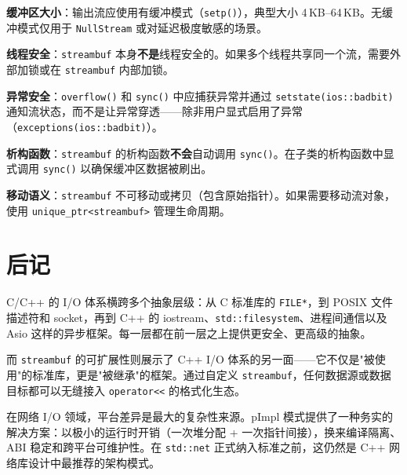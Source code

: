 \documentclass[12pt,a4paper,fontset=fandol]{ctexbook}
\newcommand{\Fn}[1]{\texttt{#1()}}
\newcommand{\Tp}[1]{\texttt{#1}}
\begin{document}
\begin{bestpractice}[title=自定义流最佳实践]
\textbf{缓冲区大小}：输出流应使用有缓冲模式（\Fn{setp}），典型大小 4\,KB--64\,KB。无缓冲模式仅用于 \Tp{NullStream} 或对延迟极度敏感的场景。

\textbf{线程安全}：\Tp{streambuf} 本身\textbf{不是}线程安全的。如果多个线程共享同一个流，需要外部加锁或在 \Tp{streambuf} 内部加锁。

\textbf{异常安全}：\Fn{overflow} 和 \Fn{sync} 中应捕获异常并通过 \Tp{setstate(ios::\allowbreak{}badbit)} 通知流状态，而不是让异常穿透——除非用户显式启用了异常（\Tp{exceptions(ios::\allowbreak{}badbit)}）。

\textbf{析构函数}：\Tp{streambuf} 的析构函数\textbf{不会}自动调用 \Tp{sync()}。在子类的析构函数中显式调用 \Tp{sync()} 以确保缓冲区数据被刷出。

\textbf{移动语义}：\Tp{streambuf} 不可移动或拷贝（包含原始指针）。如果需要移动流对象，使用 \Tp{unique\_ptr<streambuf>} 管理生命周期。
\end{bestpractice}

\chapter*{后记}

C/C++ 的 I/O 体系横跨多个抽象层级：从 C 标准库的 \Tp{FILE*}，到 POSIX 文件描述符和 socket，再到 C++ 的 iostream、\Tp{std::filesystem}、进程间通信以及 Asio 这样的异步框架。每一层都在前一层之上提供更安全、更高级的抽象。

而 \Tp{streambuf} 的可扩展性则展示了 C++ I/O 体系的另一面——它不仅是"被使用"的标准库，更是"被继承"的框架。通过自定义 \Tp{streambuf}，任何数据源或数据目标都可以无缝接入 \Tp{operator<<} 的格式化生态。

在网络 I/O 领域，平台差异是最大的复杂性来源。pImpl 模式提供了一种务实的解决方案：以极小的运行时开销（一次堆分配 + 一次指针间接），换来编译隔离、ABI 稳定和跨平台可维护性。在 \Tp{std::net} 正式纳入标准之前，这仍然是 C++ 网络库设计中最推荐的架构模式。
\end{document}
